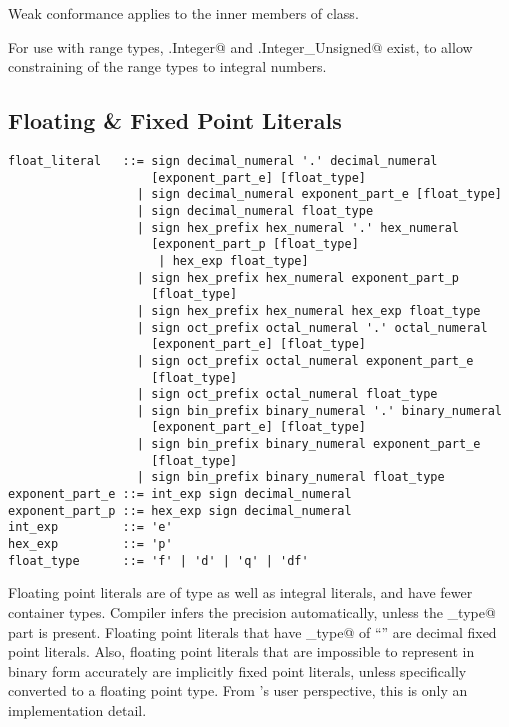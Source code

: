 Weak conformance applies to the inner members of \lstinline@Number@ class. 

For use with range types, \lstinline@Number.Integer@ and \lstinline@Number.Integer_Unsigned@ exist, to allow constraining of the range types to integral numbers.






\subsection{Floating \& Fixed Point Literals}
\label{sec:floatliterals}
\label{sec:fixedpointliterals}

\syntax\begin{lstlisting}
float_literal   ::= sign decimal_numeral '.' decimal_numeral
                    [exponent_part_e] [float_type]
                  | sign decimal_numeral exponent_part_e [float_type]
                  | sign decimal_numeral float_type
                  | sign hex_prefix hex_numeral '.' hex_numeral 
                    [exponent_part_p [float_type] 
                     | hex_exp float_type]
                  | sign hex_prefix hex_numeral exponent_part_p 
                    [float_type]
                  | sign hex_prefix hex_numeral hex_exp float_type
                  | sign oct_prefix octal_numeral '.' octal_numeral 
                    [exponent_part_e] [float_type]
                  | sign oct_prefix octal_numeral exponent_part_e 
                    [float_type]
                  | sign oct_prefix octal_numeral float_type
                  | sign bin_prefix binary_numeral '.' binary_numeral 
                    [exponent_part_e] [float_type]
                  | sign bin_prefix binary_numeral exponent_part_e 
                    [float_type]
                  | sign bin_prefix binary_numeral float_type
exponent_part_e ::= int_exp sign decimal_numeral
exponent_part_p ::= hex_exp sign decimal_numeral
int_exp         ::= 'e'
hex_exp         ::= 'p'
float_type      ::= 'f' | 'd' | 'q' | 'df'
\end{lstlisting}

Floating point literals are of type \lstinline@Number@ as well as integral literals, and have fewer container types. Compiler infers the precision automatically, unless the \lstinline@float_type@ part is present. Floating point literals that have \lstinline@float_type@ of ``'' are decimal fixed point literals. Also, floating point literals that are impossible to represent in binary form accurately are implicitly fixed point literals, unless specifically converted to a floating point type. From 's user perspective, this is only an implementation detail. 

